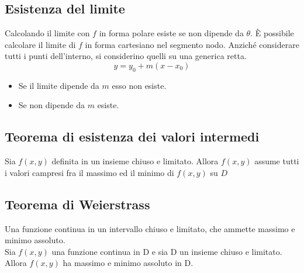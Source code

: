 \subsection{Esistenza del limite}
\begin{defi}
  Calcolando il limite con $f$ in forma polare esiste se non dipende da $\theta$. È possibile calcolare il
  limite di $f$ in forma cartesiano nel segmento nodo. Anziché considerare tutti i punti dell'interno, si
  considerino quelli su una generica retta.
  \begin{equation}
    y=y_0+m(x-x_0)
  \end{equation}
  \begin{itemize}
    \item Se il limite dipende da $m$ esso {\color{red} non esiste}.
    \item Se non dipende da $m$ {\color{red}esiste}.
  \end{itemize}  
\end{defi}
\subsection{Teorema di esistenza dei valori intermedi}
\begin{teorema}
  Sia $f(x,y)$ definita in un insieme chiuso e limitato. Allora $f(x,y)$ assume tutti i valori campresi fra
  il massimo ed il minimo di $f(x,y)$ su $D$
\end{teorema}
\subsection{Teorema di Weierstrass}
\begin{teorema}
  Una funzione continua in un intervallo chiuso e limitato, che ammette massimo e minimo assoluto.\\
  Sia $f(x,y)$ una funzione continua in D e sia D un insieme chiuso e limitato. Allora $f(x,y)$ ha
  massimo e minimo assoluto in D.
\end{teorema}
